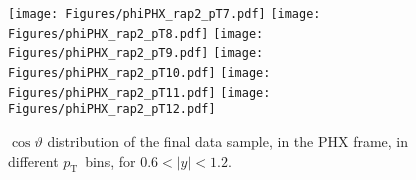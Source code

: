 \documentclass[12pt]{article}
\newcommand{\pt}{$p_{\mathrm{T}}$}
\begin{document}
\begin{figure}[htbp]
\centering
\texttt{[image: Figures/phiPHX\_rap2\_pT7.pdf]}
\texttt{[image: Figures/phiPHX\_rap2\_pT8.pdf]}
\texttt{[image: Figures/phiPHX\_rap2\_pT9.pdf]}
\texttt{[image: Figures/phiPHX\_rap2\_pT10.pdf]}
\texttt{[image: Figures/phiPHX\_rap2\_pT11.pdf]}
\texttt{[image: Figures/phiPHX\_rap2\_pT12.pdf]}
\caption{$\cos\vartheta$ distribution of the final data sample, 
	in the PHX frame, in different \pt\ bins, for $0.6 < |y| < 1.2$.}
\end{figure}
\clearpage
\end{document}
